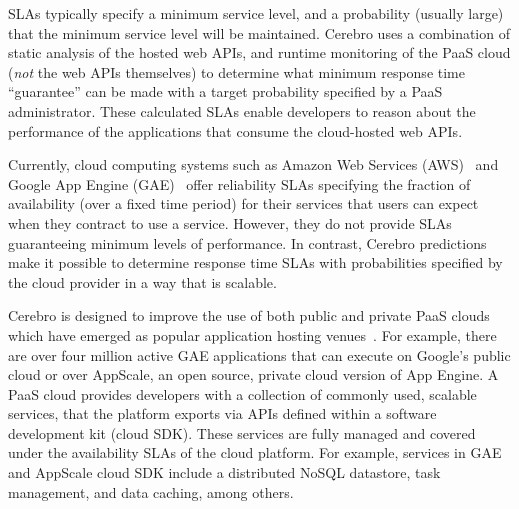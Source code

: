 SLAs typically specify a minimum service level, and a
probability (usually large) that the minimum service level will be
maintained. Cerebro uses a combination of static analysis of the hosted web APIs, 
and runtime monitoring of the PaaS cloud (\textit{not} the web APIs themselves) 
to determine what minimum response time ``guarantee'' can be made 
with a target probability specified by a PaaS administrator. These calculated
SLAs enable developers to
reason about the performance of the applications that consume the cloud-hosted
web APIs.

Currently, cloud computing systems such as Amazon Web Services
(AWS)~\cite{amazon-aws-web} and
Google App Engine (GAE)~\cite{gae} offer reliability SLAs specifying the fraction of
availability (over a fixed time period) for their services
that users can expect when they contract to use a service. However, they do not provide SLAs
guaranteeing minimum levels of performance.
In contrast, Cerebro predictions make it possible to determine response time SLAs with
probabilities specified by the cloud provider in a way that is scalable.


Cerebro is designed to improve the use of both public and private PaaS clouds 
which have emerged as popular application
hosting venues~\cite{paas-growth}.
For example, there are over four million active GAE
applications that 
can execute on Google's public cloud or over AppScale, an open source, private 
cloud version of App Engine.
A PaaS cloud provides developers 
with a collection of commonly used, scalable services,
that the platform exports via APIs defined within a software 
development kit (cloud SDK). These services are fully managed and covered under 
the availability SLAs of the cloud platform. For example, services 
in GAE and AppScale cloud SDK
include a distributed NoSQL datastore, task management, 
and data caching, among others. 

